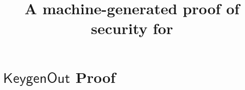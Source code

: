 \documentclass[11pt]{article}
\begin{document}


\newtheorem{definition}{Definition}
\newtheorem{theorem}{Theorem}
\newcommand{\Oracle}{\mathcal{O}}
\newcommand{\Adv}{\mathcal{A}}
\newcommand{\Bdv}{\mathcal{B}}
\newcommand{\MS}{\mathcal{M}}
\newcommand{\Psetup}{\mathsf{PSetup}}
\newcommand{\Msetup}{\mathsf{Setup}}
\newcommand{\params}{\mathit{params}}
\newcommand{\brk}[1]{\langle #1 \rangle}
\newcommand{\ait}[1]{#1}
\newcommand{\G}{\ait{\mathbb{G}}}
\newcommand{\ga}{\ait{g}_1}
\newcommand{\ha}{\ait{h}_1}
\newcommand{\poly}{\mathrm{poly}}

\newcommand{\bit}[1]{#1}
\newcommand{\gb}{\bit{g}_2}
\newcommand{\hb}{\bit{h}_2}

\newcommand{\cit}[1]{#1}
\newcommand{\Gc}{\cit{\Group_T}}
\newcommand{\gc}{\cit{g}}
\newcommand{\hc}{\cit{h}}
\newcommand{\Zp}{{\mathbb{Z}_p}}

\newcommand{\Group}{\ensuremath{\mathbb{G}}\xspace}
\newcommand{\Hroup}{\ensuremath{\mathbb{H}}\xspace}
\newcommand{\map}{\mathbf{e}}

\newcommand{\prot}{\mathsf{Prot}}
\newcommand{\auxext}{\mathit{auxext}}
\newcommand{\auxsim}{\mathit{auxsim}}
\newcommand{\aux}{\mathit{aux}}
\newcommand{\state}{\mathit{state}}
\newcommand{\Alg}{\mathsf{Alg}}
\newcommand{\A}{\mathcal{A}}

\newcommand{\Sig}{\mathsf{Sig}}
\newcommand{\Gen}{\mathsf{Gen}}
\newcommand{\TK}{\mathsf{TK}}
\newcommand{\pseudokey}{{\sf TK}_{sim}}
\newcommand{\SK}{\mathsf{SK}}
\newcommand{\PK}{\mathsf{PK}}
\newcommand{\MSK}{\mathsf{MSK}}
\newcommand{\CT}{\mathsf{CT}}
\newcommand{\Screen}{\mathsf{Screen}}
\newcommand{\Setup}{\mathsf{Setup}}
\newcommand{\Keygen}{\mathsf{Keygen}}
\newcommand{\KeygenOut}{\mathsf{KeygenOut}}
\newcommand{\Transform}{\mathsf{Transform}}
\newcommand{\Decrypt}{\mathsf{Decrypt}}
\newcommand{\Decout}{\mathsf{DecOut}}
\newcommand{\compareequals}{\stackrel{?}{=}}
\newcommand{\numsigs}{\eta}

\title{A machine-generated proof of security for {\schemename}}
\author{}
\date{}
\maketitle

\section{$\KeygenOut$ Proof}
\end{document}
